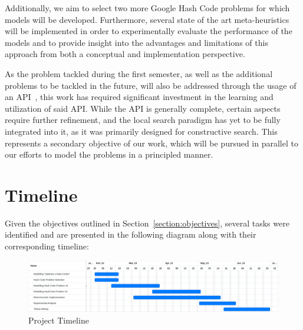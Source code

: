 Additionally, we aim to select two more Google Hash Code problems for which
models will be developed. Furthermore, several state of the art meta-heuristics
will be implemented in order to experimentally evaluate the performance of the
models and to provide insight into the advantages and limitations of this
approach from both a conceptual and implementation perspective.

As the problem tackled during the first semester, as well as the additional
problems to be tackled in the future, will also be addressed through the usage
of an API~\cite{outeiro2021application}, this work has required significant
investment in the learning and utilization of said API. While the API is
generally complete, certain aspects require further refinement, and the local
search paradigm has yet to be fully integrated into it, as it was primarily
designed for constructive search. This represents a secondary objective of our
work, which will be pursued in parallel to our efforts to model the problems in
a principled manner.

\section{Timeline}
\label{section:timeline}

Given the objectives outlined in Section~\ref{section:objectives}, several
tasks were identified and are presented in the following diagram along with
their corresponding timeline:

\begin{figure}[h]
      \centering
      \includegraphics[width=\textwidth,keepaspectratio]{../assets/gantt/gantt.pdf}
      \caption{Project Timeline}
      \label{fig:timeline}
\end{figure}

